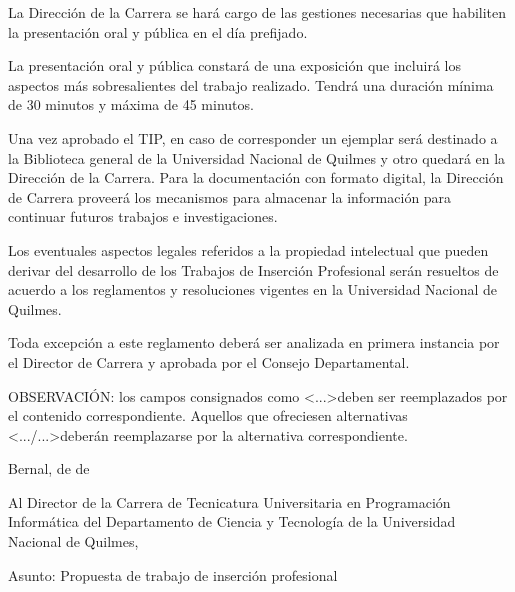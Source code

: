 \articulo La Dirección de la Carrera se hará cargo de las gestiones
necesarias que habiliten la presentación oral y pública en el día prefijado.

\articulo La presentación oral y pública constará de una exposición que incluirá
los aspectos más sobresalientes del trabajo realizado. Tendrá una duración mínima de
30 minutos y máxima de 45 minutos.





\articulo Una vez aprobado el TIP, en caso de corresponder un ejemplar será destinado a la
Biblioteca general de la Universidad Nacional de Quilmes y otro quedará en la
Dirección de la Carrera. Para la documentación con formato digital, la Dirección de Carrera
proveerá los mecanismos para almacenar la información para continuar futuros trabajos e investigaciones.

\articulo Los eventuales aspectos legales referidos a la propiedad
intelectual que pueden derivar del desarrollo de los Trabajos de Inserción Profesional
serán resueltos de acuerdo a los reglamentos y resoluciones vigentes en la
Universidad Nacional de Quilmes.


\articulo Toda excepción a este reglamento deberá ser analizada en
primera instancia por el Director de Carrera y aprobada por el Consejo Departamental.

\newpage
\resetAnexosCounter
{}

OBSERVACIÓN: los campos consignados como \textless...\textgreater deben ser reemplazados
por el contenido correspondiente. Aquellos que ofreciesen alternativas
 \textless.../...\textgreater deberán reemplazarse por la alternativa
 correspondiente.

\begin{flushright}
Bernal,  de  de \end{flushright}

Al Director de la Carrera de Tecnicatura Universitaria en Programación Informática del
Departamento de Ciencia y Tecnología de la
Universidad Nacional de Quilmes,\\

\hrulefill

Asunto: Propuesta de trabajo de inserción profesional

